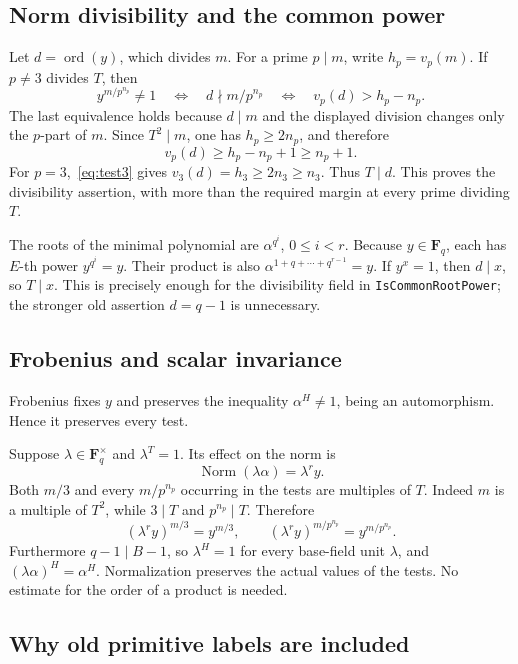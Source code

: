 \documentclass[11pt,a4paper]{article}
\newcommand{\F}{\mathbf F}
\newcommand{\ord}{\operatorname{ord}}
\newcommand{\Nm}{\operatorname{Norm}}
\newcommand{\src}[1]{\nolinkurl{#1}}
\theoremstyle{definition}
\theoremstyle{remark}
\begin{document}
\subsection{Norm divisibility and the common power}

Let $d=\ord(y)$, which divides $m$. For a prime $p\mid m$, write
$h_p=v_p(m)$. If $p\ne3$ divides $T$, then
\[
 y^{m/p^{n_p}}\ne1
 \quad\Longleftrightarrow\quad
 d\nmid m/p^{n_p}
 \quad\Longleftrightarrow\quad
 v_p(d)>h_p-n_p.
\]
The last equivalence holds because $d\mid m$ and the displayed division
changes only the $p$-part of $m$. Since $T^2\mid m$, one has
$h_p\ge2n_p$, and therefore
\begin{equation}
 v_p(d)\ge h_p-n_p+1\ge n_p+1.
 \label{eq:margin}
\end{equation}
For $p=3$,~\eqref{eq:test3} gives $v_3(d)=h_3\ge2n_3\ge n_3$.
Thus $T\mid d$. This proves the divisibility assertion, with more than
the required margin at every prime dividing $T$.

The roots of the minimal polynomial are $\alpha^{q^i}$, $0\le i<r$.
Because $y\in\F_q$, each has $E$-th power $y^{q^i}=y$. Their product is
also $\alpha^{1+q+\cdots+q^{r-1}}=y$. If $y^x=1$, then
$d\mid x$, so $T\mid x$. This is precisely enough for the divisibility
field in \src{IsCommonRootPower}; the stronger old assertion
$d=q-1$ is unnecessary.

\subsection{Frobenius and scalar invariance}

Frobenius fixes $y$ and preserves the inequality $\alpha^H\ne1$, being
an automorphism. Hence it preserves every test.

Suppose $\lambda\in\F_q^{\times}$ and $\lambda^T=1$. Its effect on the
norm is
\[
 \Nm(\lambda\alpha)=\lambda^r y.
\]
Both $m/3$ and every $m/p^{n_p}$ occurring in the tests are multiples of
$T$. Indeed $m$ is a multiple of $T^2$, while $3\mid T$ and
$p^{n_p}\mid T$. Therefore
\[
 (\lambda^r y)^{m/3}=y^{m/3},\qquad
 (\lambda^r y)^{m/p^{n_p}}=y^{m/p^{n_p}}.
\]
Furthermore $q-1\mid B-1$, so $\lambda^H=1$ for every base-field unit
$\lambda$, and $(\lambda\alpha)^H=\alpha^H$. Normalization preserves
the actual values of the tests. No estimate for the order of a product
is needed.

\subsection{Why old primitive labels are included}
\end{document}
